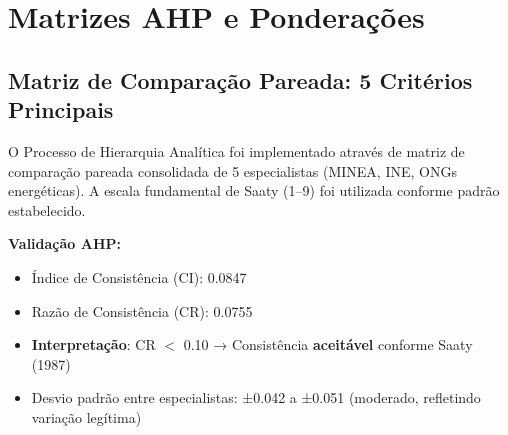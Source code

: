 \documentclass[12pt, a4paper]{article}
\begin{document}
\section{Matrizes AHP e Ponderações}
\label{app:ahp_matrix}

\subsection{Matriz de Comparação Pareada: 5 Critérios Principais}

O Processo de Hierarquia Analítica foi implementado através de matriz de comparação pareada consolidada de 5 especialistas (MINEA, INE, ONGs energéticas). A escala fundamental de Saaty (1–9) foi utilizada conforme padrão estabelecido.

\begin{table}[H]
\centering
\caption{Matriz de Comparação Pareada Normalizada (5 Critérios)}
\label{tab:ahp_matrix_detailed}
\footnotesize
{}
\end{table}

\textbf{Validação AHP:}
\begin{itemize}
\item Índice de Consistência (CI): 0.0847
\item Razão de Consistência (CR): 0.0755
\item \textbf{Interpretação}: CR $<$ 0.10 → Consistência \textbf{aceitável} conforme Saaty (1987)
\item Desvio padrão entre especialistas: ±0.042 a ±0.051 (moderado, refletindo variação legítima)
\end{itemize}
\end{document}
